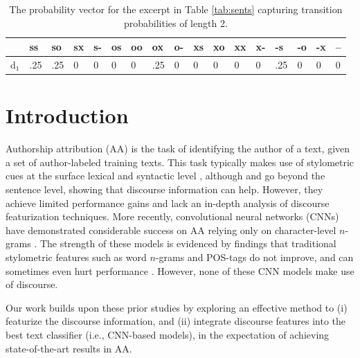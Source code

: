 \begin{table}[t]
\centering
\small
\begin{tabular}{@{}lllllllllllllllll @{}}\toprule
  & ss &so &sx &s- &os &oo &ox &o- &xs &xo &xx &x- &-s &-o &-x &--\\\midrule
d$_1$& .25 &.25 &0 &0 &0 &0 &.25 &0 &0 &0 &0 &0 &.25 &0 &0 &0\\\bottomrule
\end{tabular}
\vspace{-.5em}
\caption{\label{tab:vector} The probability vector for the excerpt in Table \ref{tab:sents} capturing transition probabilities of length 2.}
\end{table}

\section{Introduction}
\label{sec:introduction}
Authorship attribution (AA) is the task of identifying the author of a text, given a set of author-labeled training texts. This task typically makes use of stylometric cues at the surface lexical and syntactic level \cite{Stamatatos:2015}, although \citet{Feng:2014} and \citet{Feng:2015} go beyond the sentence level, showing that discourse information can help. However, they achieve limited performance gains and lack an in-depth analysis of discourse featurization techniques. More recently, convolutional neural networks (CNNs) have demonstrated considerable success on AA relying  only on character-level $n$-grams \cite{Ruder:2016,Shrestha:2017}. The strength of these models is evidenced by findings that traditional stylometric features such as word $n$-grams and POS-tags do not improve, and can sometimes even hurt performance \citep{Ruder:2016,Sari:2017}. However, none of these CNN models make use of discourse.

Our work builds upon these prior studies by exploring an effective method to (i) featurize the discourse information, and (ii) integrate discourse features into the best text classifier (i.e., CNN-based models), in the expectation of achieving state-of-the-art results in AA.


